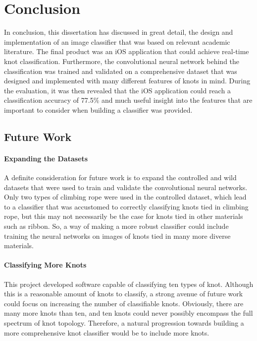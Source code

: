 \documentclass{l4proj}
\begin{document}


\chapter{Conclusion}

In conclusion, this dissertation has discussed in great detail, the design and implementation of an image classifier that was based on relevant academic literature.
The final product was an iOS application that could achieve real-time knot classification.
Furthermore, the convolutional neural network behind the classification was trained and validated on a comprehensive dataset that was designed and implemented with many different features of knots in mind.
During the evaluation, it was then revealed that the iOS application could reach a classification accuracy of 77.5\% and much useful insight into the features that are important to consider when building a classifier was provided.

\section{Future Work}

\subsubsection{Expanding the Datasets}
A definite consideration for future work is to expand the controlled and wild datasets that were used to train and validate the convolutional neural networks.
Only two types of climbing rope were used in the controlled dataset, which lead to a classifier that was accustomed to correctly classifying knots tied in climbing rope, but this may not necessarily be the case for knots tied in other materials such as ribbon. So, a way of making a more robust classifier could include training the neural networks on images of knots tied in many more diverse materials.

\subsubsection{Classifying More Knots}
This project developed software capable of classifying ten types of knot. Although this is a reasonable amount of knots to classify, a strong avenue of future work could focus on increasing the number of classifiable knots. Obviously, there are many more knots than ten, and ten knots could never possibly encompass the full spectrum of knot topology. Therefore, a natural progression towards building a more comprehensive knot classifier would be to include more knots.
\end{document}
